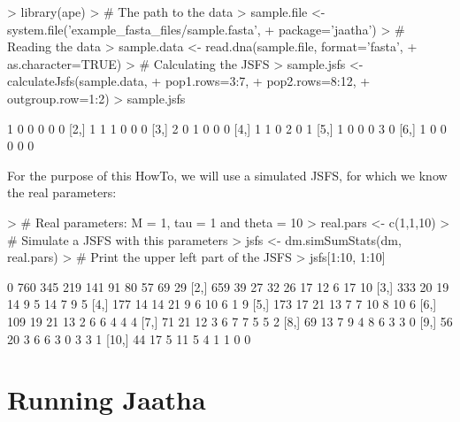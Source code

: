 \documentclass[a4paper]{article}
\begin{document}
\begin{Schunk}
\begin{Sinput}
> library(ape)
> # The path to the data
> sample.file <- system.file('example_fasta_files/sample.fasta', 
+                            package='jaatha')
> # Reading the data
> sample.data <- read.dna(sample.file, format='fasta', 
+                         as.character=TRUE)
> # Calculating the JSFS
> sample.jsfs <- calculateJsfs(sample.data, 
+                              pop1.rows=3:7, 
+                              pop2.rows=8:12,
+                              outgroup.row=1:2)
> sample.jsfs
\end{Sinput}
\begin{Soutput}
     [,1] [,2] [,3] [,4] [,5] [,6]
[1,]    1    0    0    0    0    0
[2,]    1    1    1    0    0    0
[3,]    2    0    1    0    0    0
[4,]    1    1    0    2    0    1
[5,]    1    0    0    0    3    0
[6,]    1    0    0    0    0    0
\end{Soutput}
\end{Schunk}

\vspace{1em}
\noindent
For the purpose of this HowTo, we will use a simulated JSFS, for which we 
know the real parameters:

\begin{Schunk}
\begin{Sinput}
> # Real parameters: M = 1, tau = 1 and theta = 10
> real.pars <- c(1,1,10) 
> # Simulate a JSFS with this parameters
> jsfs <- dm.simSumStats(dm, real.pars)
> # Print the upper left part of the JSFS
> jsfs[1:10, 1:10]
\end{Sinput}
\begin{Soutput}
      [,1] [,2] [,3] [,4] [,5] [,6] [,7] [,8] [,9] [,10]
 [1,]    0  760  345  219  141   91   80   57   69    29
 [2,]  659   39   27   32   26   17   12    6   17    10
 [3,]  333   20   19   14    9    5   14    7    9     5
 [4,]  177   14   14   21    9    6   10    6    1     9
 [5,]  173   17   21   13    7    7   10    8   10     6
 [6,]  109   19   21   13    2    6    6    4    4     4
 [7,]   71   21   12    3    6    7    7    5    5     2
 [8,]   69   13    7    9    4    8    6    3    3     0
 [9,]   56   20    3    6    6    3    0    3    3     1
[10,]   44   17    5   11    5    4    1    1    0     0
\end{Soutput}
\end{Schunk}

\section{Running Jaatha}
\end{document}
